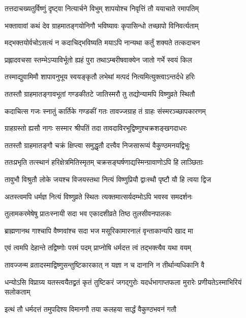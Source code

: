 \twolineshloka
{तत्तदाचख्यतुर्विष्णुं दृष्ट्वा नित्यार्चने विभुम्}
{शापयोश्च निवृत्तिं तौ ययाचाते रमापतिम्} %


\twolineshloka
{भक्तावावां कथं देव ग्राहमातङ्गयोनिगौ}
{भविष्यावः कृपासिन्धो तच्छापो विनिवर्त्यताम्} %


\twolineshloka
{मद्भक्तयोर्वचोऽसत्यं न कदाचिद्भविष्यति}
{मयाऽपि नान्यथा कर्तुं शक्यते तत्कदाचन} %

\twolineshloka
{प्रह्लादवचसा स्तम्भेऽप्याविर्भूतो ह्यहं पुरा}
{तथाऽम्बरीषवाक्येन जातो गर्भे स्वयं किल} %

\twolineshloka
{तस्माद्युवामिमौ शापावनुभूय स्वयङ्कृतौ}
{लभेथां मत्पदं नित्यमित्युक्त्वाऽन्तर्दधे हरिः} %

\twolineshloka
{ततस्तौ ग्राहमातङ्गावभूतां गण्डकीतटे}
{जातिस्मरौ तु तद्योन्यामपि विष्णुव्रते स्थितौ} %


\twolineshloka
{कदाचित्स गजः स्नातुं कार्तिके गण्डकीं गतः}
{तावज्जग्राह तं ग्राहः संस्मरञ्च्छापकारणम्} %

\twolineshloka
{ग्राहग्रस्तो ह्यसौ नागः सस्मार श्रीपतिं तदा}
{तावदाविरभूद्विष्णुश्चक्रशङ्खगदाधरः} %

\twolineshloka
{ततस्तौ ग्राहमातङ्गौ चक्रं क्षिप्त्वा समुद्धृतौ}
{दत्त्वैव निजसारूप्यं वैकुण्ठमनयद्विभुः} %

\twolineshloka
{ततःप्रभृति तत्स्थानं हरिक्षेत्रमितिस्मृतम्}
{चक्रसङ्घर्षणाद्यस्मिन्ग्रावाणोऽपि हि लाञ्छिताः} %

\twolineshloka
{तावुभौ विश्रुतौ लोके जयश्च विजयस्तथा}
{नित्यं विष्णुप्रियौ द्वाःस्थौ पृष्टौ यौ हि त्वया द्विज} %

\twolineshloka
{अतस्त्वमपि धर्मज्ञ नित्यं विष्णुव्रते स्थितः}
{त्यक्तमात्सर्यदम्भोऽपि भवस्व समदर्शनः} %

\twolineshloka
{तुलामकरमेषेषु प्रातःस्नायी सदा भव}
{एकादशीव्रते तिष्ठ तुलसीवनपालकः} %

\twolineshloka
{ब्राह्मणानथ गाश्चापि वैष्णवांश्च सदा भज}
{मसूरिकामारनालं वृन्ताकान्यपि खाद मा} %

\twolineshloka
{एवं त्वमपि देहान्ते तद्विष्णोः परमं पदम्}
{प्राप्नोषि धर्मदत्त त्वं तद्भक्त्यैव यथा वयम्} %

\twolineshloka
{तावज्जन्म व्रतादस्माद्विष्णुसन्तुष्टिकारकात्}
{न यज्ञा न च दानानि न तीर्थान्यधिकानि वै} %

\twolineshloka
{धन्योऽसि विप्राग्र्य यतस्त्वयैतद्व्रतं कृतं तुष्टिकरं जगद्गुरोः}
{यदर्धभागाप्तफला मुरारेः प्रणीयतेऽस्माभिरियं सलोकताम्} %


\twolineshloka
{इत्थं तौ धर्मदत्तं तमुपदिश्य विमानगौ}
{तया कलहया सार्द्धं वैकुण्ठभवनं गतौ} %


